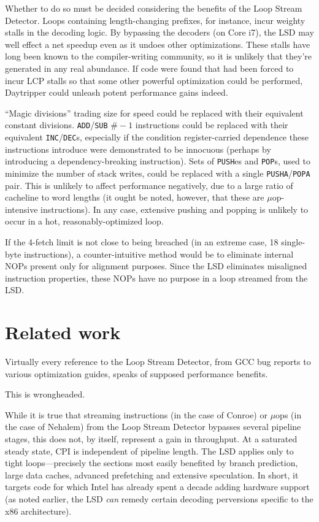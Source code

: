 \documentclass[]{sigplanconf}
\begin{document}
Whether to do so must be decided considering the benefits of the Loop Stream
Detector. Loops containing length-changing prefixes, for instance, incur weighty
stalls in the decoding logic. By bypassing the decoders (on Core\texttrademark
i7), the LSD may well effect a net speedup even as it undoes other optimizations.
These stalls have long been known to the compiler-writing community, so it is
unlikely that they're generated in any real abundance. If code were found that
had been forced to incur LCP stalls so that some other powerful optimization
could be performed, Daytripper could unleash potent performance gains indeed.

``Magic divisions'' trading size for speed \cite{knuth2} could be replaced
with their equivalent constant divisions. \texttt{ADD}/\texttt{SUB} $\#-1$ instructions
could be replaced with their equivalent \texttt{INC}/\texttt{DEC}s, especially
if the condition register-carried dependence these instructions introduce
were demonstrated to be innocuous (perhaps by introducing a dependency-breaking
instruction). Sets of \texttt{PUSH}es and \texttt{POP}s, used
to minimize the number of stack writes, could be replaced with a single
\texttt{PUSHA}/\texttt{POPA} pair. This is unlikely to affect performance negatively,
due to a large ratio of cacheline to word lengths (it ought be noted, however,
that these are $\mu$op-intensive instructions). In any case, extensive pushing
and popping is unlikely to occur in a hot, reasonably-optimized loop.

If the 4-fetch limit is not close to being breached (in an extreme case, 18
single-byte instructions), a counter-intuitive method would be to eliminate
internal NOPs present only for alignment purposes. Since the LSD eliminates
misaligned instruction properties, these NOPs have no purpose in a loop
streamed from the LSD.
\section{Related work}
Virtually every reference to the Loop Stream Detector, from GCC bug reports
\cite{gcclsd} to various optimization guides, speaks of supposed performance benefits.

This is wrongheaded.

While it is true that streaming instructions (in the case of Conroe) or $\mu$ops
(in the case of Nehalem) from the Loop Stream Detector bypasses several pipeline stages,
this does not, by itself, represent a gain in throughput. At a saturated steady
state, CPI is independent of pipeline length. The LSD applies only to tight
loops---precisely the sections most easily benefited by branch prediction,
large data caches, advanced prefetching and extensive speculation. In short,
it targets code for which Intel has already spent a decade adding hardware
support (as noted earlier, the LSD \textit{can} remedy certain decoding
perversions specific to the x86 architecture).
\end{document}

